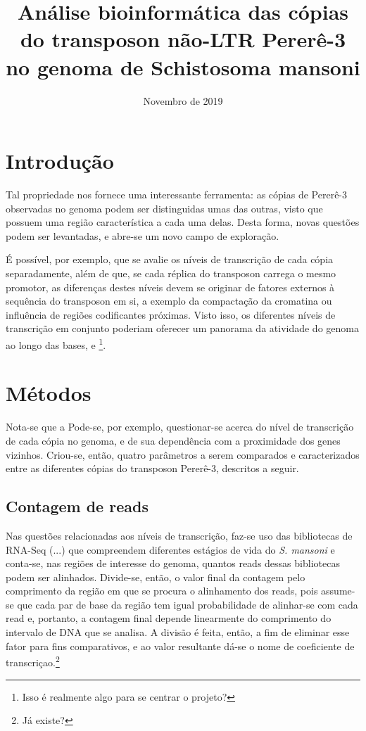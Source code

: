 \documentclass{article}
\title{Análise bioinformática das cópias do transposon não-LTR Pererê-3 no genoma de Schistosoma mansoni}
\date{Novembro de 2019}
\begin{document}
\begin{multicols}{2}
\section{Introdução}

Tal propriedade nos fornece uma interessante ferramenta: as cópias de Pererê-3 observadas no genoma podem ser distinguidas umas das outras, visto que possuem uma região característica a cada uma delas. Desta forma, novas questões podem ser levantadas, e abre-se um novo campo de exploração.

É possível, por exemplo, que se avalie os níveis de transcrição de cada cópia separadamente, além de que, se cada réplica do transposon carrega o mesmo promotor, as diferenças destes níveis devem se originar de fatores externos à sequência do transposon em si, a exemplo da compactação da cromatina ou influência de regiões codificantes próximas. Visto isso, os diferentes níveis de transcrição em conjunto poderiam oferecer um panorama da atividade do genoma ao longo das bases, e  \footnote{Isso é realmente algo para se centrar o projeto?}.
\section{Métodos}
Nota-se que a
Pode-se, por exemplo, questionar-se acerca do nível de transcrição de cada cópia no genoma, e de sua dependência com a proximidade dos genes vizinhos.
Criou-se, então, quatro parâmetros a serem comparados e caracterizados entre as diferentes cópias do transposon Pererê-3, descritos a seguir.

\subsection{Contagem de reads}
Nas questões relacionadas aos níveis de transcrição, faz-se uso das bibliotecas de RNA-Seq (...) que compreendem diferentes estágios de vida do \textit{S. mansoni} e conta-se, nas regiões de interesse do genoma, quantos reads dessas bibliotecas podem ser alinhados. Divide-se, então, o valor final da contagem pelo comprimento da região em que se procura o alinhamento dos reads, pois assume-se que cada par de base da região tem igual probabilidade de alinhar-se com cada read e, portanto, a contagem final depende linearmente do comprimento do intervalo de DNA que se analisa. A divisão é feita, então, a fim de eliminar esse fator para fins comparativos, e ao valor resultante dá-se o nome de coeficiente de transcriçao.\footnote{Já existe?}


\end{multicols}
\end{document}
